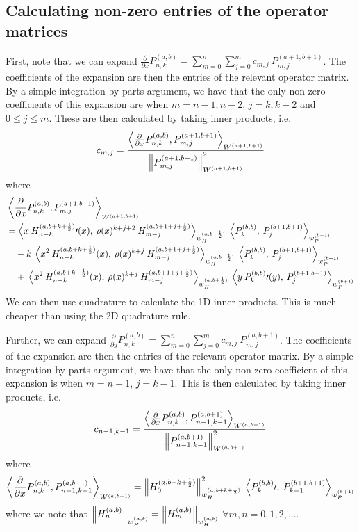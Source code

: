 \documentclass[11pt, oneside]{article}   	%
\newcommand{\half}{\frac{1}{2}}
\newcommand{\pddx}{\frac{\partial}{\partial x}}
\newcommand{\pddy}{\frac{\partial}{\partial y}}
\newcommand{\Pnkab}{P_{n,k}^{(a,b)}}
\begin{document}
\subsection{Calculating non-zero entries of the operator matrices}

First, note that we can expand $\pddx \Pnkab = \sum_{m=0}^{n} \sum_{j=0}^m c_{m,j} \: P^{(a+1, b+1)}_{m,j}$. The coefficients of the expansion are then the entries of the relevant operator matrix. By a simple integration by parts argument, we have that the only non-zero coefficients of this expansion are when $m = n-1, n-2$, $j = k, k-2$ and $0 \le j \le m$. These are then calculated by taking inner products, i.e. 
\begin{align*}
c_{m,j} = \frac{\ip<\pddx \Pnkab, P^{(a+1, b+1)}_{m,j} >_{W^{(a+1, b+1)}}}{\norm{P^{(a+1, b+1)}_{m,j}}^2_{W^{(a+1, b+1)}}}
\end{align*}
where 
\begin{align}
	&\ip<\pddx \Pnkab, P^{(a+1, b+1)}_{m,j} >_{W^{(a+1, b+1)}} \nonumber \\ 
	&= \ip< x \: H_{n-k}^{(a, b+k+\half)} \prime (x), \: \rho(x)^{k+j+2} \: H_{m-j}^{(a, b+1+j+\half)} >_{w_H^{(a, b+\half)}} 
		\: \ip< P_k^{(b,b)}, \: P_j^{(b+1,b+1)} >_{w_P^{(b+1)}}  \nonumber \\ 
	& \quad - k \: \ip< x^2 \: H_{n-k}^{(a, b+k+\half)}(x), \: \rho(x)^{k+j} \: H_{m-j}^{(a, b+1+j+\half)} >_{w_H^{(a, b+\half)}} 
		\: \ip< P_k^{(b,b)}, \: P_j^{(b+1,b+1)} >_{w_P^{(b+1)}}  \nonumber \\ 
	& \quad + \: \ip< x^2 \: H_{n-k}^{(a, b+k+\half)}(x), \: \rho(x)^{k+j} \: H_{m-j}^{(a, b+1+j+\half)} >_{w_H^{(a, b+\half)}} 
		\: \ip< y \: P_k^{(b,b)} \prime (y), \: P_j^{(b+1,b+1)} >_{w_P^{(b+1)}}  
\end{align}
We can then use quadrature to calculate the 1D inner products. This is much cheaper than using the 2D quadrature rule.

Further, we can expand $\pddy \Pnkab = \sum_{m=0}^{n} \sum_{j=0}^m c_{m,j} \: P^{(a, b+1)}_{m,j}$. The coefficients of the expansion are then the entries of the relevant operator matrix. By a simple integration by parts argument, we have that the only non-zero coefficient of this expansion is when $m = n-1$, $j = k-1$. This is then calculated by taking inner products, i.e. 
\begin{align*}
c_{n-1,k-1} = \frac{\ip<\pddx \Pnkab, P^{(a, b+1)}_{n-1,k-1} >_{W^{(a, b+1)}}}{\norm{P^{(a, b+1)}_{n-1,k-1}}^2_{W^{(a, b+1)}}}
\end{align*}
where 
\begin{align}
	\ip<\pddx \Pnkab, P^{(a, b+1)}_{n-1,k-1} >_{W^{(a, b+1)}} = \norm{H_0^{(a,b+k+\half)}}^2_{w_H^{(a, b+k+\half)}} 
		\: \ip< P_k^{(b,b)} \prime, \: P_{k-1}^{(b+1,b+1)} >_{w_P^{(b+1)}}
\end{align}
where we note that $\left\| H_n^{(a,b)} \right\|_{w_H^{(a,b)}} = \left\| H_m^{(a,b)} \right\|_{w_H^{(a,b)}}$ $\forall m, n = 0, 1, 2, \dots$. 
\end{document}
